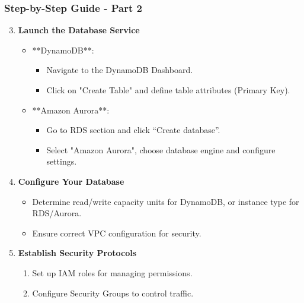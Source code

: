 \documentclass[aspectratio=169]{beamer}
\begin{document}
\begin{frame}[fragile]
    \frametitle{Step-by-Step Guide - Part 2}
    \begin{enumerate}
        \setcounter{enumi}{2}  %
        \item \textbf{Launch the Database Service}
            \begin{itemize}
                \item **DynamoDB**:
                    \begin{itemize}
                        \item Navigate to the DynamoDB Dashboard.
                        \item Click on "Create Table" and define table attributes (Primary Key).
                    \end{itemize}
                \item **Amazon Aurora**:
                    \begin{itemize}
                        \item Go to RDS section and click “Create database”.
                        \item Select "Amazon Aurora", choose database engine and configure settings.
                    \end{itemize}
            \end{itemize}
        \item \textbf{Configure Your Database}
            \begin{itemize}
                \item Determine read/write capacity units for DynamoDB, or instance type for RDS/Aurora.
                \item Ensure correct VPC configuration for security.
            \end{itemize}
        \item \textbf{Establish Security Protocols}
            \begin{enumerate}
                \item Set up IAM roles for managing permissions.
                \item Configure Security Groups to control traffic.
            \end{enumerate}
    \end{enumerate}
\end{frame}
\end{document}
